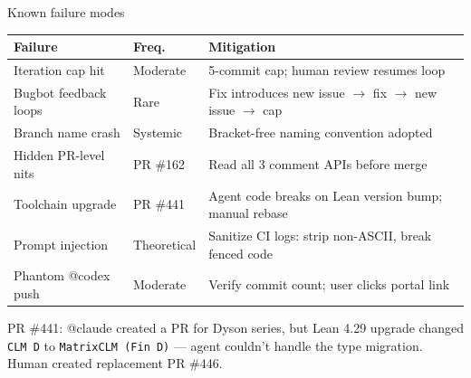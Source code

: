\documentclass[aspectratio=169,10pt]{beamer}
\begin{document}
\begin{frame}{Known failure modes}
    \vspace{-0.4em}
    \begin{center}
    \renewcommand{\arraystretch}{1.15}
    {\footnotesize
    \begin{tabular}{@{}p{3cm} l p{6cm}@{}}
        \toprule
        \textbf{Failure} & \textbf{Freq.} & \textbf{Mitigation} \\
        \midrule
        Iteration cap hit & Moderate & 5-commit cap; human review resumes loop \\
        Bugbot feedback loops & Rare & Fix introduces new issue $\to$ fix $\to$ new issue $\to$ cap \\
        Branch name crash & Systemic & Bracket-free naming convention adopted \\
        Hidden PR-level nits & PR \#162 & Read all 3 comment APIs before merge \\
        Toolchain upgrade & PR \#441 & Agent code breaks on Lean version bump; manual rebase \\
        Prompt injection & Theoretical & Sanitize CI logs: strip non-ASCII, break fenced code \\
        Phantom @codex push & Moderate & Verify commit count; user clicks portal link \\
        \bottomrule
    \end{tabular}
    }
    \end{center}
    \vspace{0.3em}
    \textcolor{dimwhite}{\footnotesize PR \#441: @claude created a PR for Dyson series, but Lean 4.29 upgrade changed \texttt{CLM D} to \texttt{MatrixCLM (Fin D)} --- agent couldn't handle the type migration. Human created replacement PR \#446.}
\end{frame}
\end{document}
